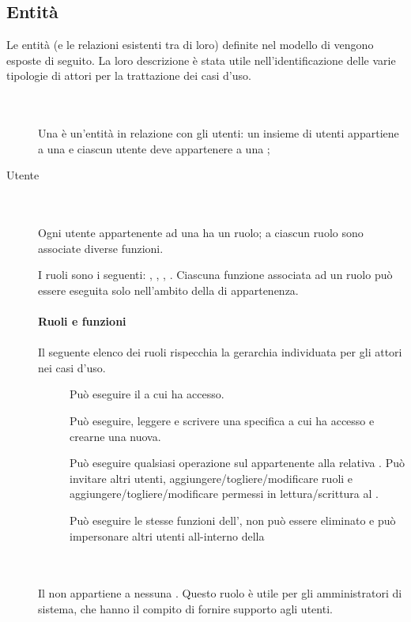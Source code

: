 \subsection{Entit\`a}
Le entit\`a (e le relazioni esistenti tra di loro) definite nel modello  di  vengono esposte di seguito. La loro descrizione \`e stata utile nell'identificazione delle varie tipologie di attori per la trattazione dei casi d'uso.
\begin{description}
	\item[] \hfill \\\\
	Una  \`e un'entit\`a in relazione con gli utenti: un insieme di utenti appartiene a una  e ciascun utente deve appartenere a una ;
	\item[Utente] \hfill \\\\
	Ogni utente appartenente ad una  ha un ruolo; a ciascun ruolo sono associate diverse funzioni.	
	
	I ruoli sono i seguenti: , , , .	
	Ciascuna funzione associata ad un ruolo pu\`o essere eseguita solo nell'ambito della  di appartenenza. \\\\
	\textbf{Ruoli e funzioni} \hfill \\\\
		Il seguente elenco dei ruoli rispecchia la gerarchia individuata per gli attori nei casi d'uso.
		\begin{description}
			\item[] Pu\`o eseguire il  a cui ha accesso.
			\item[] Pu\`o eseguire, leggere e scrivere una specifica  a cui ha accesso e crearne una nuova.
			\item[] Pu\`o eseguire qualsiasi operazione sul  appartenente alla relativa . Pu\`o invitare altri utenti, aggiungere/togliere/modificare ruoli e aggiungere/togliere/modificare permessi in lettura/scrittura al .
			\item[] Pu\`o eseguire le stesse funzioni dell', non pu\`o essere eliminato e pu\`o impersonare altri utenti all-interno della 
		\end{description}
	\item[] \hfill \\\\
	Il  non appartiene a nessuna . Questo ruolo \`e utile per gli amministratori di sistema, che hanno il compito di fornire supporto agli utenti.
\end{description}

\newpage
